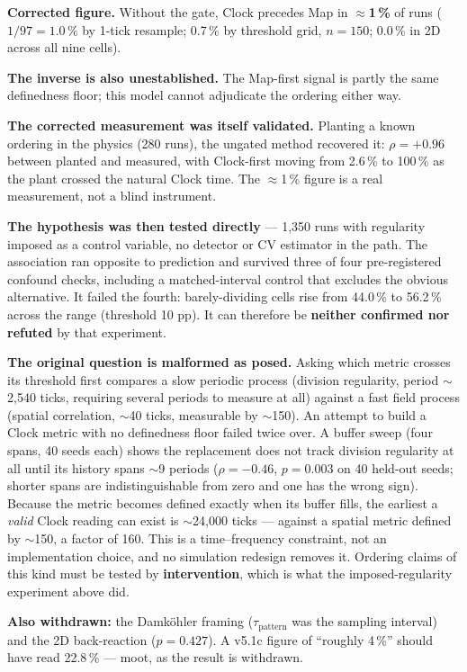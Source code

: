 \documentclass[11pt,letterpaper]{article}
\begin{document}
\textbf{Corrected figure.} Without the gate, Clock precedes Map in
\textbf{$\approx$1\,\%} of runs ($1/97 = 1.0$\,\% by 1-tick resample;
0.7\,\% by threshold grid, $n = 150$; 0.0\,\% in 2D across all nine
cells).

\textbf{The inverse is also unestablished.} The Map-first signal is
partly the same definedness floor; this model cannot adjudicate the
ordering either way.

\textbf{The corrected measurement was itself validated.} Planting a
known ordering in the physics (280 runs), the ungated method recovered
it: $\rho = +0.96$ between planted and measured, with Clock-first moving
from 2.6\,\% to 100\,\% as the plant crossed the natural Clock time. The
$\approx$1\,\% figure is a real measurement, not a blind instrument.

\textbf{The hypothesis was then tested directly} --- 1{,}350 runs with
regularity imposed as a control variable, no detector or CV estimator in
the path. The association ran opposite to prediction and survived three
of four pre-registered confound checks, including a matched-interval
control that excludes the obvious alternative. It failed the fourth:
barely-dividing cells rise from 44.0\,\% to 56.2\,\% across the range
(threshold 10 pp). It can therefore be \textbf{neither confirmed nor
refuted} by that experiment.

\textbf{The original question is malformed as posed.} Asking which
metric crosses its threshold first compares a slow periodic process
(division regularity, period $\sim$2{,}540 ticks, requiring several
periods to measure at all) against a fast field process (spatial
correlation, $\sim$40 ticks, measurable by $\sim$150). An attempt to
build a Clock metric with no definedness floor failed twice over. A
buffer sweep (four spans, 40 seeds each) shows the replacement does not
track division regularity at all until its history spans $\sim$9 periods
($\rho = -0.46$, $p = 0.003$ on 40 held-out seeds; shorter spans are
indistinguishable from zero and one has the wrong sign). Because the
metric becomes defined exactly when its buffer fills, the earliest a
\emph{valid} Clock reading can exist is $\sim$24{,}000 ticks --- against
a spatial metric defined by $\sim$150, a factor of 160. This is a
time--frequency constraint, not an implementation choice, and no
simulation redesign removes it. Ordering claims of this kind must be
tested by \textbf{intervention}, which is what the imposed-regularity
experiment above did.

\textbf{Also withdrawn:} the Damk\"ohler framing ($\tau_{\text{pattern}}$
was the sampling interval) and the 2D back-reaction ($p = 0.427$). A
v5.1c figure of ``roughly 4\,\%'' should have read 22.8\,\% --- moot, as
the result is withdrawn.
\end{document}

